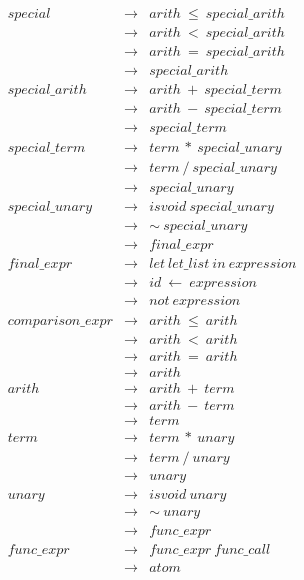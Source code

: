 \documentclass{article}
\begin{document}
\begin{eqnarray*}
    special          & \rightarrow & arith \ \le \ special\_arith \\
                     & \rightarrow & arith \ < \ special\_arith \\
                     & \rightarrow & arith \ = \ special\_arith \\
                     & \rightarrow & special\_arith \\
    special\_arith   & \rightarrow & arith \ + \ special\_term \\
                     & \rightarrow & arith \ - \ special\_term \\
                     & \rightarrow & special\_term \\
    special\_term    & \rightarrow & term \ * \ special\_unary \\
			         & \rightarrow & term \ / \ special\_unary \\
			         & \rightarrow & special\_unary \\
	special\_unary   & \rightarrow & isvoid \ special\_unary \\	
	                 & \rightarrow & \sim \ special\_unary \\
	                 & \rightarrow & final\_expr \\		        
    final\_expr      & \rightarrow & let \ let\_list \ in \ expression \\
                     & \rightarrow & id \ \leftarrow \ expression \\
                     & \rightarrow & not \ expression \\
    comparison\_expr & \rightarrow & arith \ \le \ arith \\
			         & \rightarrow & arith \ < \ arith \\
			         & \rightarrow & arith \ = \ arith \\
			         & \rightarrow & arith \\
    arith            & \rightarrow & arith \ + \ term \\
                     & \rightarrow & arith \ - \ term \\
                     & \rightarrow & term \\
    term             & \rightarrow & term \ * \ unary \\
                     & \rightarrow & term \ / \ unary \\
                     & \rightarrow & unary \\
    unary            & \rightarrow & isvoid \ unary \\	
                     & \rightarrow & \sim \ unary \\
                     & \rightarrow & func\_expr \\
    func\_expr       & \rightarrow & func\_expr \ func\_call \\
                     & \rightarrow & atom \\
\end{eqnarray*}
\end{document}
